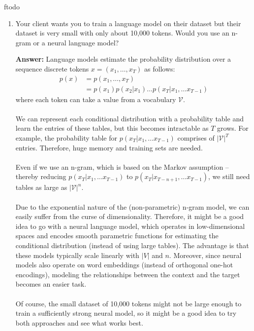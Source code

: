 ƒtodo\documentclass{article}
\newenvironment{QandA}{\begin{enumerate}[label=\arabic*.]}{\end{enumerate}}
\newenvironment{answer}{\par\normalfont \textbf{Answer:}}{}
\newcommand{\g}{\vert}
\begin{document}
\begin{QandA}
    \item Your client wants you to train a language model on their dataset but their dataset is very small with only about 10,000 tokens. Would you use an n-gram or a neural language model?
    \begin{answer}
        Language models estimate the probability distribution over a sequence discrete tokens $x = (x_1, \ldots, x_T)$ as follows:
        \begin{align*}
            p(x) &= p(x_1, \ldots, x_T) \\
            &= p(x_1) p(x_2 \g x_1) \ldots p(x_T \g x_1, \ldots x_{T-1})
        \end{align*}
        where each token can take a value from a vocabulary $\mathcal{V}$.\\\\
        We can represent each conditional distribution with a probability table and learn the entries of these tables, but this becomes intractable as $T$ grows. For example, the probability table for $p(x_T \g x_1, \ldots x_{T-1})$ comprises of $\vert \mathcal{V}\vert^T$ entries. Therefore, huge memory and training sets are needed. \\\\
        Even if we use an n-gram, which is based on the Markov assumption -- thereby reducing $p(x_T \g x_1, \ldots x_{T-1})$ to $p(x_T \g x_{T-n+1}, \ldots x_{T-1})$, we still need tables as large as $\vert \mathcal{V} \vert^n$. \\\\
        Due to the exponential nature of the (non-parametric) n-gram model, we can easily suffer from the curse of dimensionality. Therefore, it might be a good idea to go with a neural language model, which operates in low-dimensional spaces and encodes smooth parametric functions for estimating the conditional distribution (instead of using large tables). The advantage is that these models typically scale linearly with $\vert V \vert$ and $n$. Moreover, since neural models also operate on word embeddings (instead of orthogonal one-hot encodings), modeling the relationships between the context and the target becomes an easier task. \\\\
        Of course, the small dataset of 10,000 tokens might not be large enough to train a sufficiently strong neural model, so it might be a good idea to try both approaches and see what works best.
    \end{answer}


\end{QandA}
\end{document}
